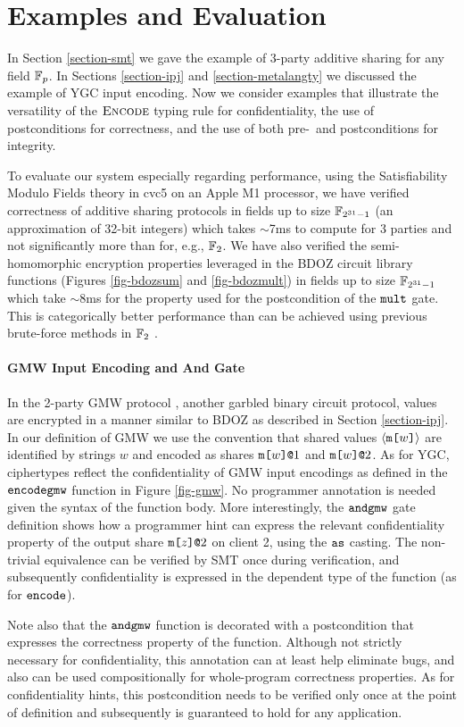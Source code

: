 \section{Examples and Evaluation}
\label{section-examples}

In Section \ref{section-smt} we gave the example of 3-party additive
sharing for any field $\mathbb{F}_{p}$. In Sections \ref{section-ipj} and
\ref{section-metalangty} we discussed the example of YGC input encoding.
Now we consider examples that illustrate the versatility of the
$\text{\sc Encode}$ typing rule for confidentiality, the use of
postconditions for correctness, and the use of both pre-~and
postconditions for integrity.

To evaluate our system especially regarding performance, using the
Satisfiability Modulo Fields theory in cvc5 on an Apple M1 processor,
we have verified correctness of additive sharing protocols in fields
up to size $\mathbb{F}_{2^{31} - 1}$ (an approximation of 32-bit integers)
which takes $\sim$7ms to compute for 3 parties and not significantly more
than for, e.g., $\mathbb{F}_{2}$. We have also verified the semi-homomorphic
encryption properties leveraged in the BDOZ circuit library functions
(Figures \ref{fig-bdozsum} and \ref{fig-bdozmult}) in fields up to
size $\mathbb{F}_{2^{31} - 1}$ which take $\sim$8ms for the property used for
the postcondition of the $\texttt{mult}$ gate. This is categorically
better performance than can be achieved using previous brute-force
methods in $\mathbb{F}_{2}$ \cite{skalka-near-ppdp24}.



\paragraph{GMW Input Encoding and And Gate}
In the 2-party GMW protocol \cite{evans2018pragmatic}, another garbled
binary circuit protocol, values are encrypted in a manner similar to
BDOZ as described in Section \ref{section-ipj}. In our definition of
GMW we use the convention that shared values $\langle \texttt{m[}w\texttt{]} \rangle$ are
identified by strings $w$ and encoded as shares $\texttt{m[}w\texttt{]}\texttt{@}1$ and
$\texttt{m[}w\texttt{]}\texttt{@}2$.  As for YGC, ciphertypes reflect the confidentiality of
GMW input encodings as defined in the $\texttt{encodegmw}$ function in
Figure \ref{fig-gmw}. No programmer annotation is needed given the
syntax of the function body. More interestingly, the $\texttt{andgmw}$
gate definition shows how a programmer hint can express the relevant
confidentiality property of the output share $\texttt{m[}z\texttt{]}\texttt{@}2$ on client 2,
using the $\texttt{as}$ casting. The non-trivial equivalence can be
verified by SMT once during verification, and subsequently
confidentiality is expressed in the dependent type of the function (as
for $\texttt{encode}$).

Note also that the $\texttt{andgmw}$ function is decorated with a
postcondition that expresses the correctness property of the
function. Although not strictly necessary for confidentiality, this
annotation can at least help eliminate bugs, and also can be used
compositionally for whole-program correctness properties. As for
confidentiality hints, this postcondition needs to be verified only
once at the point of definition and subsequently is guaranteed to hold
for any application.

